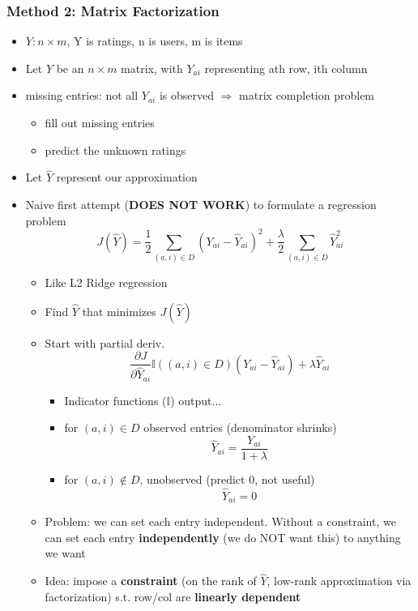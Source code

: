 \documentclass[10pt, oneside]{article}
\begin{document}
\subsubsection{Method 2: Matrix Factorization}
\begin{itemize}
    \item $Y: n\times m$, Y is ratings, n is users, m is items
    \item Let $Y$ be an $n\times m$ matrix, with $Y_{ai}$ representing ath row, ith column
    \item missing entries: not all $Y_{ai}$ is observed $\Rightarrow$ matrix completion problem
    \begin{itemize}
        \item fill out missing entries
        \item predict the unknown ratings
    \end{itemize}
    \item Let $\hat Y$ represent our approximation
    \item Naive first attempt (\textbf{DOES NOT WORK}) to formulate a regression problem
    \[J(\hat Y) = \frac{1}{2} \underset{(a,i)\in D}{\sum} (Y_{ai}- \hat Y_{ai})^2 + \frac{\lambda}{2}  \underset{(a,i)\in D}{\sum} \hat Y_{ai}^2\]
    \begin{itemize}
        \item Like L2 Ridge regression
        \item Find $\hat Y$ that minimizes $J(\hat Y)$
        \item Start with partial deriv.
        \[\frac{\partial J}{\partial \hat Y_{ai}} \mathbb{I}((a,i) \in D) (Y_{ai} - \hat Y_{ai}) + \lambda \hat Y_{ai}\]
        \begin{itemize}
            \item Indicator functions ($\mathbb{I}$) output...
            \item for $(a,i) \in D$ observed entries (denominator shrinks)
            \[\hat Y_{ai} = \frac{Y_{ai}}{1 + \lambda}\]
            \item for $(a,i) \notin D$, unobserved (predict 0, not useful)
            \[\hat Y_{ai} = 0\]
        \end{itemize}
        \item Problem: we can set each entry independent. Without a constraint, we can set each entry \textbf{independently} (we do NOT want this) to anything we want
        \item Idea: impose a \textbf{constraint} (on the rank of $\hat Y$, low-rank approximation via factorization) s.t. row/col are \textbf{linearly dependent}

\end{itemize}
\end{itemize}
\end{document}
